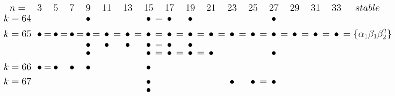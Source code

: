 \documentclass{article}
\begin{document}
\(
\begin{tikzcd}[
nodes={font=\Large,inner sep=0pt},
row sep=0.2cm,
column sep=0.1cm
]
n= && & 3 & & 5 & & 7 & & 9 & & 11 & & 13 & & 15 & & 17 && 19 && 21 && 23 && 25 && 27 && 29 && 31 && 33 & stable \\
k=64 &&& && && && \bullet && && && \bullet &=& \bullet && \bullet && && && && \bullet && \\ \\
k=65 &&& \bullet &=& \bullet &=& \bullet &=& \bullet &=& \bullet &=& \bullet &=& \bullet &=& \bullet &=& \bullet &=& \bullet &=& \bullet &=& \bullet &=& \bullet &=& \bullet &=& \bullet &=& \bullet & =\{\alpha_1\beta_1\beta_2^2\} \\
&&& && && && \bullet && \bullet && \bullet && \bullet &=& \bullet && \bullet && && && && \\
&&& && && && \bullet && && && \bullet &=& \bullet &=& \bullet &=& \bullet && && && \bullet \\ \\
k=66 &&& \bullet &=& \bullet && \bullet && \bullet && && && \bullet \\ \\
k=67 &&& && && && && && && \bullet && && && && \bullet && \bullet &=& \bullet \\
&&& && && && && && && \bullet \\
\\
\end{tikzcd}
\)
\end{document}
